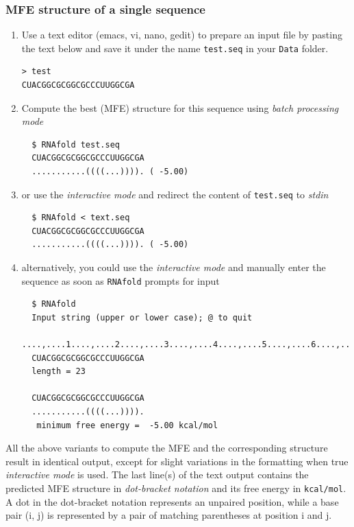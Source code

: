 \documentclass[a4paper]{article}
\begin{document}
\subsubsection{MFE structure of a single sequence}

\begin{enumerate}
\item Use a text editor (emacs, vi, nano, gedit) to prepare an input file by pasting the text 
below and save it under the name \texttt{test.seq} in your \texttt{Data} folder.
\begin{verbatim}
> test
CUACGGCGCGGCGCCCUUGGCGA
\end{verbatim}
\item Compute the best (MFE) structure for this sequence using \textit{batch processing mode}
\begin{verbatim}
  $ RNAfold test.seq
  CUACGGCGCGGCGCCCUUGGCGA
  ...........((((...)))). ( -5.00)
 \end{verbatim}%
\item or use the \textit{interactive mode} and redirect the content of \texttt{test.seq}
to \textit{stdin}
\begin{verbatim}
  $ RNAfold < text.seq
  CUACGGCGCGGCGCCCUUGGCGA
  ...........((((...)))). ( -5.00)
\end{verbatim}
\item alternatively, you could use the \textit{interactive mode} and manually enter the sequence
  as soon as \texttt{RNAfold} prompts for input
\begin{verbatim}
  $ RNAfold
  Input string (upper or lower case); @ to quit
  ....,....1....,....2....,....3....,....4....,....5....,....6....,....7....,....8
  CUACGGCGCGGCGCCCUUGGCGA
  length = 23

  CUACGGCGCGGCGCCCUUGGCGA
  ...........((((...)))).
   minimum free energy =  -5.00 kcal/mol
 \end{verbatim}%
\end{enumerate}

All the above variants to compute the MFE and the corresponding structure result in identical
output, except for slight variations in the formatting when true \textit{interactive mode} is used.
The last line(s) of the text output contains the predicted MFE structure in \textit{dot-bracket notation}
and its free energy in \texttt{kcal/mol}. A dot in the dot-bracket notation represents an unpaired
position, while a base pair (i, j) is represented by a pair of matching parentheses at position
i and j.
\end{document}
